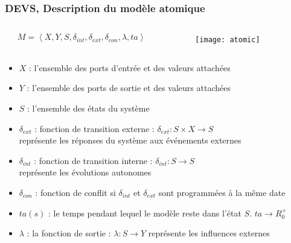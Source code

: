 \documentclass[xetex, compress, table, svgnames]{beamer}
\begin{document}
\begin{frame}
  \frametitle{DEVS, Description du modèle atomique}
  \begin{exampleblock}{}
    \begin{columns}
      \begin{column}[c]{.45\textwidth}
        \begin{equation*}
          M = \left\langle X,Y, S, \delta_{\mathit{int}}, \delta_{\mathit{ext}},
            \delta_{\mathit{con}},\lambda, \mathit{ta} \right\rangle
        \end{equation*}
      \end{column}
      \begin{column}[c]{.45\textwidth}
        \begin{figure}[h]
          \begin{center}
            \texttt{[image: atomic]}
          \end{center}
        \end{figure}
      \end{column}
    \end{columns}
  \end{exampleblock}
  \begin{exampleblock}{}
    \begin{itemize}[<+->]
    \item $X$ : l'ensemble des \alert{ports d'entrée} et des valeurs
      attachées
    \item $Y$ : l'ensemble des \alert{ports de sortie} et des valeurs
      attachées
    \item $S$ : l'ensemble des \alert{états} du système
    \item $\delta_{ext}$ : fonction de \alert{transition externe} :
      $\delta_{ext} : S \times X \rightarrow S$\\représente les
      réponses du système aux événements externes
    \item $\delta_{int}$ : fonction de \alert{transition interne} :
      $\delta_{int} : S \rightarrow S$\\représente les évolutions
      autonomes
    \item $\delta_{con}$ : fonction de \alert{conflit} si
      $\delta_{int}$ et $\delta_{ext}$ sont programmées à la même date
    \item $ta(s)$ : \alert{le temps} pendant lequel le modèle reste
      dans l'état $S$. $ta \rightarrow R_0^+$
    \item $\lambda$ : la \alert{fonction de sortie} : $\lambda : S
      \rightarrow Y$ représente les influences externes
    \end{itemize}
  \end{exampleblock}
\end{frame}
\end{document}
